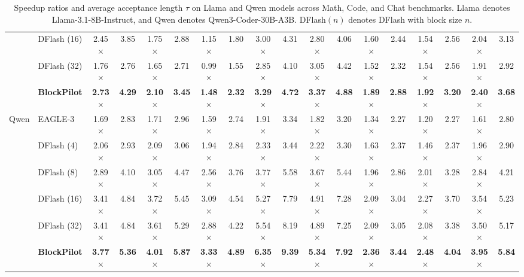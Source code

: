 \documentclass{llmxive}
\begin{document}
\begin{table}[ht]
{\begin{tabular}{@{}ll*{8}{cc}@{}}
& DFlash (16) & 2.45$\times$ & 3.85 & 1.75$\times$ & 2.88 & 1.15$\times$ & 1.80 & 3.00$\times$ & 4.31 & 2.80$\times$ & 4.06 & 1.60$\times$ & 2.44 & 1.54$\times$ & 2.56 & 2.04$\times$ & 3.13 \\
& DFlash (32) & 1.76$\times$ & 2.76 & 1.65$\times$ & 2.71 & 0.99$\times$ & 1.55 & 2.85$\times$ & 4.10 & 3.05$\times$ & 4.42 & 1.52$\times$ & 2.32 & 1.54$\times$ & 2.56 & 1.91$\times$ & 2.92 \\
& \textbf{BlockPilot} & \textbf{2.73$\times$} & \textbf{4.29} & \textbf{2.10$\times$} & \textbf{3.45} & \textbf{1.48$\times$} & \textbf{2.32} & \textbf{3.29$\times$} & \textbf{4.72} & \textbf{3.37$\times$} & \textbf{4.88} & \textbf{1.89$\times$} & \textbf{2.88} & \textbf{1.92$\times$} & \textbf{3.20} & \textbf{2.40$\times$} & \textbf{3.68} \\
\midrule
\multirow{6}{*}{Qwen}
& EAGLE-3     & 1.69$\times$ & 2.83 & 1.71$\times$ & 2.96 & 1.59$\times$ & 2.74 & 1.91$\times$ & 3.34 & 1.82$\times$ & 3.20 & 1.34$\times$ & 2.27 & 1.20$\times$ & 2.27 & 1.61$\times$ & 2.80 \\
& DFlash (4)  & 2.06$\times$ & 2.93 & 2.09$\times$ & 3.06 & 1.94$\times$ & 2.84 & 2.33$\times$ & 3.44 & 2.22$\times$ & 3.30 & 1.63$\times$ & 2.37 & 1.46$\times$ & 2.37 & 1.96$\times$ & 2.90 \\
& DFlash (8)  & 2.89$\times$ & 4.10 & 3.05$\times$ & 4.47 & 2.56$\times$ & 3.76 & 3.77$\times$ & 5.58 & 3.67$\times$ & 5.44 & 1.96$\times$ & 2.86 & 2.01$\times$ & 3.28 & 2.84$\times$ & 4.21 \\
& DFlash (16) & 3.41$\times$ & 4.84 & 3.72$\times$ & 5.45 & 3.09$\times$ & 4.54 & 5.27$\times$ & 7.79 & 4.91$\times$ & 7.28 & 2.09$\times$ & 3.04 & 2.27$\times$ & 3.70 & 3.54$\times$ & 5.23 \\
& DFlash (32) & 3.41$\times$ & 4.84 & 3.61$\times$ & 5.29 & 2.88$\times$ & 4.22 & 5.54$\times$ & 8.19 & 4.89$\times$ & 7.25 & 2.09$\times$ & 3.05 & 2.08$\times$ & 3.38 & 3.50$\times$ & 5.17 \\
& \textbf{BlockPilot} & \textbf{3.77$\times$} & \textbf{5.36} & \textbf{4.01$\times$} & \textbf{5.87} & \textbf{3.33$\times$} & \textbf{4.89} & \textbf{6.35$\times$} & \textbf{9.39} & \textbf{5.34$\times$} & \textbf{7.92} & \textbf{2.36$\times$} & \textbf{3.44} & \textbf{2.48$\times$} & \textbf{4.04} & \textbf{3.95$\times$} & \textbf{5.84} \\
\bottomrule
\end{tabular}%
}
\caption{Speedup ratios and average acceptance length $\tau$ on Llama and Qwen models across Math, Code, and Chat benchmarks. Llama denotes Llama-3.1-8B-Instruct, and Qwen denotes Qwen3-Coder-30B-A3B. DFlash$(n)$ denotes DFlash with block size $n$.}
\label{tab:llama_qwen_speedup_acceptance}
\end{table}
\end{document}

